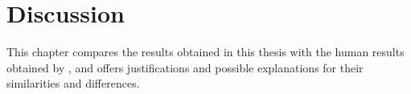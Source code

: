 \chapter{Discussion}
\label{chapter:Discussion}
\thispagestyle{myheadings}

\graphicspath{{6_Discussion/Figures/}}

This chapter compares the results obtained in this thesis with the human results obtained by \citeauthor{Mehraei2016Auditory}, and offers justifications and possible explanations for their similarities and differences.